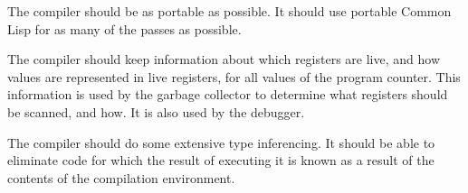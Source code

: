 The compiler should be as portable as possible.  It should use
portable Common Lisp for as many of the passes as possible.  

The compiler should keep information about which registers are live,
and how values are represented in live registers, for all values of
the program counter.  This information is used by the garbage
collector to determine what registers should be scanned, and how.   It
is also used by the debugger.  

The compiler should do some extensive type inferencing.  It should be
able to eliminate code for which the result of executing it is known
as a result of the contents of the compilation environment.  

